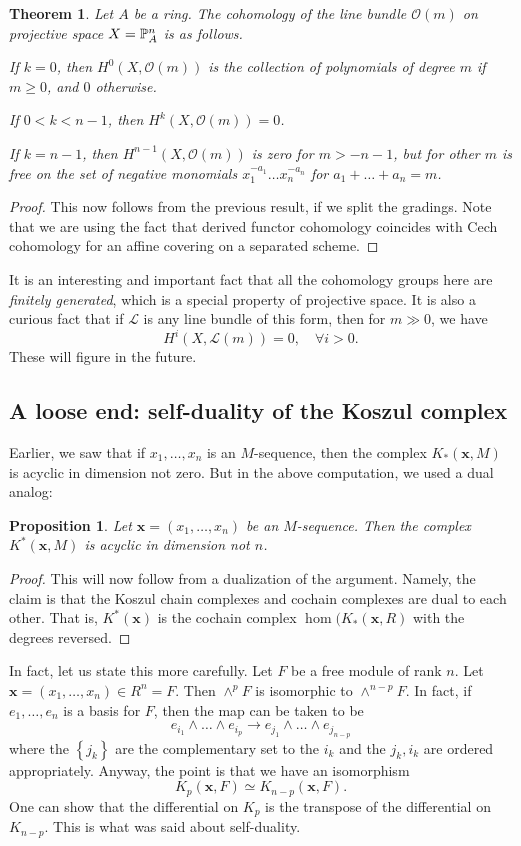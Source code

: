 \documentclass{article}
\newtheorem{theorem}{Theorem}
\newtheorem{proposition}{Proposition}
\begin{document}
\begin{theorem} 
Let $A$ be a ring. The cohomology of the line bundle $\mathcal{O}(m)$ on projective
space $X=\P^n_A$ is as follows.

If $k = 0$, then $H^0(X,\mathcal{O}(m))$ is the collection of polynomials of degree $m$
if $m  \geq 0$, and $0$ otherwise.

If $ 0< k < n-1$, then $H^k(X, \mathcal{O}(m)) = 0$. 

If $k=n-1$, then $H^{n-1}(X, \mathcal{O}(m))$ is zero for $m > -n-1$, but for other $m$
is free on the set of negative monomials $x_1^{-a_1} \dots x_n^{-a_n}$ for $a_1
+ \dots + a_n  = m$.
\end{theorem} 
\begin{proof} 
This now follows from the previous result, if we split the gradings. Note that
we are using the fact that derived functor cohomology coincides with Cech
cohomology for an affine covering on a separated scheme.
\end{proof} 


It is an interesting and important fact that all the cohomology groups here are
\emph{finitely generated}, which is a special property of projective space.
It is also a curious fact that if $\mathcal{L}$ is any line bundle of this form, then for $m \gg 0$, 
we have 
\[ H^i(X, \mathcal{L}(m))=0, \quad \forall i >0.  \]
These will figure in the future.


\subsection{ A loose end: self-duality of the Koszul complex}
Earlier, we saw that if $x_1, \dots, x_n$ is an $M$-sequence, then the complex
$K_*(\mathbf{x}, M)$ is acyclic in dimension not zero. But in the above
computation, we used a dual analog:

\begin{proposition} 
Let $\mathbf{x}=(x_1, \dots, x_n)$ be an $M$-sequence. Then the complex
$K^*(\mathbf{x},M)$ is acyclic in dimension not $n$. 
\end{proposition} 
\begin{proof} 
This will now follow from a dualization of the argument. Namely, the claim is
that the Koszul chain complexes and cochain complexes are dual to each other.
That is, $K^*(\mathbf{x}) $ is the cochain complex $\hom(K_*(\mathbf{x}, R)$
with the degrees reversed.
\end{proof} 

In fact, let us state this more carefully. Let $F$ be a free module of rank $n$.
Let $\mathbf{x} = (x_1, \dots,x_n) \in R^n = F$.
Then $\wedge^p F$ is isomorphic to $\wedge^{n-p} F$. In fact, if 
$e_1, \dots, e_n$ is a basis for $F$, then the map can be taken to be
\[ e_{i_1} \wedge \dots \wedge e_{i_p} \to e_{j_1} \wedge \dots \wedge
e_{j_{n-p}}\]
where the $\left\{j_k\right\}$ are the complementary set to the $i_k$ and the
$j_k,i_k$ are ordered appropriately. Anyway, the point is that we have an
isomorphism
\[ K_p(\mathbf{x}, F) \simeq K_{n-p}(\mathbf{x}, F).   \]
One can show that the differential on $K_p$ is the transpose of the 
differential on $K_{n-p}$. This is what was said about self-duality.
\end{document}
